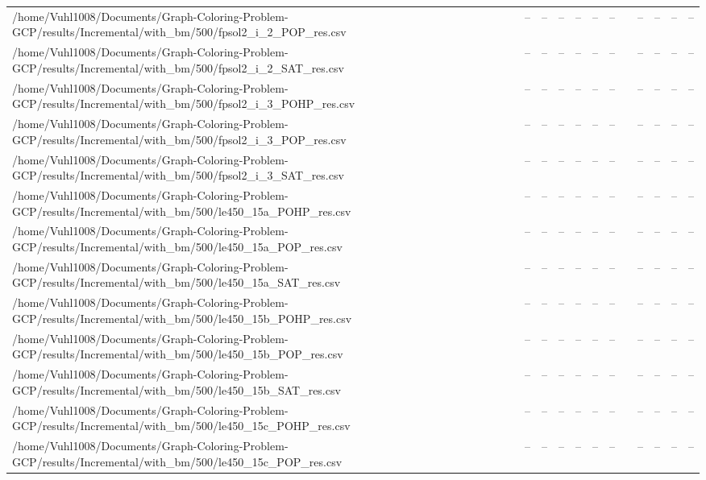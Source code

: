 \begin{table}[htbp]
\begin{tabular}{llllllllllll}
/home/Vuhl1008/Documents/Graph-Coloring-Problem-GCP/results/Incremental/with\_bm/500/fpsol2\_i\_2\_POP\_res.csv & -- & -- & -- & -- & -- & -- & {} & -- & -- & -- & -- \\
/home/Vuhl1008/Documents/Graph-Coloring-Problem-GCP/results/Incremental/with\_bm/500/fpsol2\_i\_2\_SAT\_res.csv & -- & -- & -- & -- & -- & -- & {} & -- & -- & -- & -- \\
/home/Vuhl1008/Documents/Graph-Coloring-Problem-GCP/results/Incremental/with\_bm/500/fpsol2\_i\_3\_POHP\_res.csv & -- & -- & -- & -- & -- & -- & {} & -- & -- & -- & -- \\
/home/Vuhl1008/Documents/Graph-Coloring-Problem-GCP/results/Incremental/with\_bm/500/fpsol2\_i\_3\_POP\_res.csv & -- & -- & -- & -- & -- & -- & {} & -- & -- & -- & -- \\
/home/Vuhl1008/Documents/Graph-Coloring-Problem-GCP/results/Incremental/with\_bm/500/fpsol2\_i\_3\_SAT\_res.csv & -- & -- & -- & -- & -- & -- & {} & -- & -- & -- & -- \\
/home/Vuhl1008/Documents/Graph-Coloring-Problem-GCP/results/Incremental/with\_bm/500/le450\_15a\_POHP\_res.csv & -- & -- & -- & -- & -- & -- & {} & -- & -- & -- & -- \\
/home/Vuhl1008/Documents/Graph-Coloring-Problem-GCP/results/Incremental/with\_bm/500/le450\_15a\_POP\_res.csv & -- & -- & -- & -- & -- & -- & {} & -- & -- & -- & -- \\
/home/Vuhl1008/Documents/Graph-Coloring-Problem-GCP/results/Incremental/with\_bm/500/le450\_15a\_SAT\_res.csv & -- & -- & -- & -- & -- & -- & {} & -- & -- & -- & -- \\
/home/Vuhl1008/Documents/Graph-Coloring-Problem-GCP/results/Incremental/with\_bm/500/le450\_15b\_POHP\_res.csv & -- & -- & -- & -- & -- & -- & {} & -- & -- & -- & -- \\
/home/Vuhl1008/Documents/Graph-Coloring-Problem-GCP/results/Incremental/with\_bm/500/le450\_15b\_POP\_res.csv & -- & -- & -- & -- & -- & -- & {} & -- & -- & -- & -- \\
/home/Vuhl1008/Documents/Graph-Coloring-Problem-GCP/results/Incremental/with\_bm/500/le450\_15b\_SAT\_res.csv & -- & -- & -- & -- & -- & -- & {} & -- & -- & -- & -- \\
/home/Vuhl1008/Documents/Graph-Coloring-Problem-GCP/results/Incremental/with\_bm/500/le450\_15c\_POHP\_res.csv & -- & -- & -- & -- & -- & -- & {} & -- & -- & -- & -- \\
/home/Vuhl1008/Documents/Graph-Coloring-Problem-GCP/results/Incremental/with\_bm/500/le450\_15c\_POP\_res.csv & -- & -- & -- & -- & -- & -- & {} & -- & -- & -- & -- \\

\end{tabular}
\end{table}
